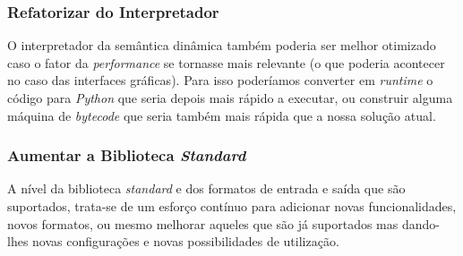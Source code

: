 \subsubsection*{Refatorizar do Interpretador}
O interpretador da semântica dinâmica também poderia ser melhor otimizado caso o fator da \textit{performance} se tornasse mais relevante (o que poderia acontecer no caso das interfaces gráficas). Para isso poderíamos converter em \textit{runtime} o código para \textit{Python} que seria depois mais rápido a executar, ou construir alguma máquina de \textit{bytecode} que seria também mais rápida que a nossa solução atual.

\subsubsection*{Aumentar a Biblioteca \textit{Standard}}
A nível da biblioteca \textit{standard} e dos formatos de entrada e saída que são suportados, trata-se de um esforço contínuo para adicionar novas funcionalidades, novos formatos, ou mesmo melhorar aqueles que são já suportados mas dando-lhes novas configurações e novas possibilidades de utilização.
